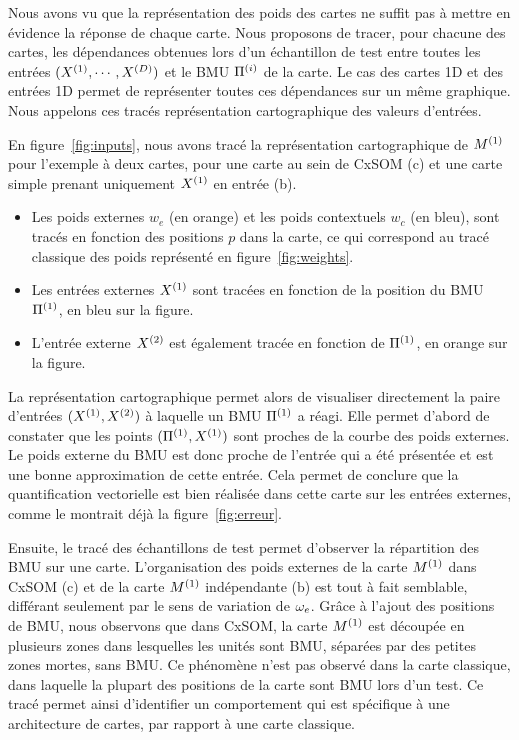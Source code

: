 \documentclass[../main]{subfiles}
\begin{document}
Nous avons vu que la représentation des poids des cartes ne suffit pas à mettre en évidence la réponse de chaque carte. Nous proposons de tracer, pour chacune des cartes, les dépendances obtenues lors d'un échantillon de test entre toutes les entrées $(X^{({1})}, \cdots, X^{({D})})$ et le BMU $\Pi^{({i})}$ de la carte. Le cas des cartes 1D et des entrées 1D permet de représenter toutes ces dépendances sur un même graphique.
Nous appelons ces tracés représentation cartographique des valeurs d'entrées.

En figure~\ref{fig:inputs}, nous avons tracé la représentation cartographique de $M^{({1})}$ pour l'exemple à deux cartes, pour une carte au sein de CxSOM (c) et une carte simple prenant uniquement $X^{({1})}$ en entrée (b).
\begin{itemize}
    \item Les poids externes $w_e$ (en orange) et les poids contextuels $w_c$ (en bleu), sont tracés en fonction des positions $p$ dans la carte, ce qui correspond au tracé classique des poids représenté en figure~\ref{fig:weights}.
    \item Les entrées externes $X^{({1})}$ sont tracées en fonction de la position du BMU $\Pi^{({1})}$, en bleu sur la figure.
    \item L'entrée externe $X^{({2})}$ est également tracée en fonction de $\Pi^{({1})}$, en orange sur la figure. 
\end{itemize}

La représentation cartographique permet alors de visualiser directement la paire d'entrées $(X^{({1})}, X^{({2})})$ à laquelle un BMU $\Pi^{({1})}$ a réagi.
Elle permet d'abord de constater que les points $(\Pi^{({1})},X^{({1})})$ sont proches de la courbe des poids externes. Le poids externe du BMU est donc proche de l'entrée qui a été présentée et est une bonne approximation de cette entrée. 
Cela permet de conclure que la quantification vectorielle est bien réalisée dans cette carte sur les entrées externes, comme le montrait déjà la figure~\ref{fig:erreur}.

Ensuite, le tracé des échantillons de test permet d'observer la répartition des BMU sur une carte. 
L'organisation des poids externes de la carte $M^{({1})}$ dans CxSOM (c) et de la carte $M^{({1})}$ indépendante (b) est tout à fait semblable, différant seulement par le sens de variation de $\omega_e$.
Grâce à l'ajout des positions de BMU, nous observons que dans CxSOM, la carte $M^{({1})}$ est découpée en plusieurs zones dans lesquelles les unités sont BMU, séparées par des petites zones mortes, sans BMU. Ce phénomène n'est pas observé dans la carte classique, dans laquelle la plupart des positions de la carte sont BMU lors d'un test. 
Ce tracé permet ainsi d'identifier un comportement qui est spécifique à une architecture de cartes, par rapport à une carte classique. 
\end{document}
